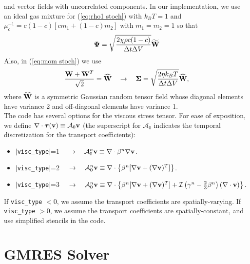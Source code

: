 \documentclass[final]{siamltex}
\def\vb {{\bf v}}
\def\Wb {{\bf W}}
\def\Psib   {\boldsymbol{\Psi}}
\def\Sigmab {\boldsymbol{\Sigma}}
\def\taub   {\boldsymbol{\tau}}
\begin{document}
and vector fields with uncorrelated components.  In our implementation, 
we use an ideal gas mixture for (\ref{eq:rho1 stoch}) with 
$k_BT=1$ and $\mu_c^{-1}=c(1-c)[cm_1+(1-c)m_2]$ with $m_1=m_2=1$ so that
\begin{equation}
\Psib = \sqrt{\frac{2\chi\rho c(1-c)}{\Delta t\Delta V}}\widetilde\Wb
\end{equation}
Also, in (\ref{eq:mom stoch}) we use
\begin{equation}
\frac{\Wb + \Wb^T}{\sqrt{2}} = \widehat\Wb \quad \rightarrow \quad
\Sigmab = \sqrt{\frac{2\eta k_B T}{\Delta t\Delta V}}\widehat\Wb,
\end{equation}
where $\widehat\Wb$ is a symmetric Gaussian random tensor field whose diagonal elements
have variance 2 and off-diagonal elements have variance 1.\\

The code has several options for the viscous stress tensor.  For ease of exposition,
we define $\nabla\cdot\taub(\vb)\equiv\mathcal{A}_0\vb$ (the superscript
for $\mathcal{A}_0$ indicates the temporal discretization for the transport coefficients):\\
\begin{itemize}
\item $|${\tt visc\_type}$|$=1 $\quad\rightarrow\quad \mathcal{A}_0^n\vb \equiv \nabla\cdot\beta^n\nabla\vb$.\\
\item $|${\tt visc\_type}$|$=2 $\quad\rightarrow\quad \mathcal{A}_0^n\vb \equiv \nabla\cdot\left\{\beta^n[\nabla\vb + (\nabla\vb)^T]\right\}$.\\
\item $|${\tt visc\_type}$|$=3 $\quad\rightarrow\quad \mathcal{A}_0^n\vb \equiv \nabla\cdot\left\{\beta^n[\nabla\vb + (\nabla\vb)^T] + \mathcal{I}\left(\gamma^n - \frac{2}{3}\beta^n\right)(\nabla\cdot\vb)\right\}$.\\
\end{itemize}
If {\tt visc\_type} $<0$, we assume the transport coefficients are spatially-varying.
If {\tt visc\_type} $>0$, we assume the transport coefficients are spatially-constant, and use simplified stencils
in the code.

\section{GMRES Solver}
\end{document}
